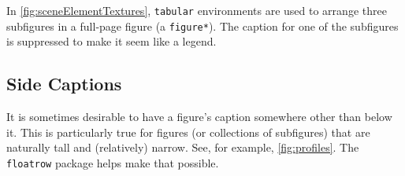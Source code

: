 In \autoref{fig:sceneElementTextures}, \texttt{tabular} environments are used to arrange three subfigures in a full-page figure (a \texttt{figure*}).
The caption for one of the subfigures is suppressed to make it seem like a legend.

\subsection{Side Captions}%
It is sometimes desirable to have a figure's caption somewhere other than below it.
This is particularly true for figures (or collections of subfigures) that are naturally tall and (relatively) narrow.
See, for example, \autoref{fig:profiles}.
The \texttt{floatrow} package helps make that possible.

\newlength{\forceCaptionWidth}%
\setlength{\forceCaptionWidth}{\columnwidth}%
\addtolength{\forceCaptionWidth}{-4in}%
\addtolength{\forceCaptionWidth}{-1em}%
%
